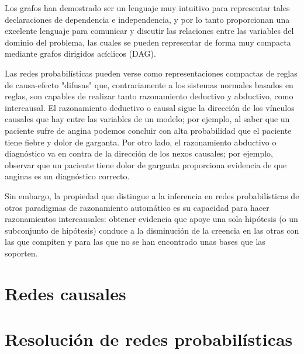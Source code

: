 Los grafos han demostrado ser un lenguaje muy intuitivo para representar
tales declaraciones de dependencia e independencia, y por lo tanto proporcionan una excelente
lenguaje para comunicar y discutir las relaciones entre las 
variables del dominio del problema, las cuales se pueden representar de forma muy compacta 
mediante grafos dirigidos acíclicos (DAG).

Las redes probabilísticas pueden verse como representaciones compactas de reglas de causa-efecto "difusas" 
que, contrariamente a los sistemas normales basados en reglas, son capables de realizar tanto razonamiento 
deductivo y abductivo, como intercausal. El razonamiento deductivo o causal
sigue la dirección de los vínculos causales que hay entre las variables de un modelo; por ejemplo, al saber
que un paciente sufre de angina podemos concluir con alta probabilidad que
el paciente tiene fiebre y dolor de garganta. Por otro lado, el razonamiento abductivo o diagnóstico 
va en contra de la dirección de los nexos causales; por ejemplo, observar
que un paciente tiene dolor de garganta proporciona evidencia de que anginas es un diagnóstico correcto.

Sin embargo, la propiedad que distingue a la inferencia en redes probabilísticas
de otros paradigmas de razonamiento automático es su capacidad para hacer razonamientos intercausales: 
obtener evidencia que apoye una sola hipótesis (o un subconjunto de
hipótesis) conduce a la disminución de la creencia en las otras con las que compiten y para las que no se 
han encontrado unas bases que las soporten. 

\section{Redes causales}

\section{Resolución de redes probabilísticas}

